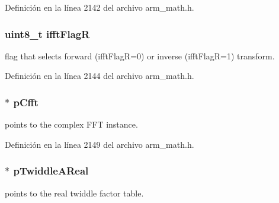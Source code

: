 Definición en la línea 2142 del archivo arm\+\_\+math.\+h.

\subsubsection[{\texorpdfstring{ifft\+FlagR}{ifftFlagR}}]{\setlength{\rightskip}{0pt plus 5cm}uint8\+\_\+t ifft\+FlagR}\hypertarget{structarm__rfft__instance__q15_a787d72055c89e4d62b188d6bd646341c}{}\label{structarm__rfft__instance__q15_a787d72055c89e4d62b188d6bd646341c}
flag that selects forward (ifft\+FlagR=0) or inverse (ifft\+FlagR=1) transform. 

Definición en la línea 2144 del archivo arm\+\_\+math.\+h.

\subsubsection[{\texorpdfstring{p\+Cfft}{pCfft}}]{$\ast$ p\+Cfft}\hypertarget{structarm__rfft__instance__q15_ae0ac7c3a89699793fc0dac960db7f056}{}\label{structarm__rfft__instance__q15_ae0ac7c3a89699793fc0dac960db7f056}
points to the complex F\+FT instance. 

Definición en la línea 2149 del archivo arm\+\_\+math.\+h.

\subsubsection[{\texorpdfstring{p\+Twiddle\+A\+Real}{pTwiddleAReal}}]{$\ast$ p\+Twiddle\+A\+Real}\hypertarget{structarm__rfft__instance__q15_ac17beaa033ab1ea242d49037276b67e2}{}\label{structarm__rfft__instance__q15_ac17beaa033ab1ea242d49037276b67e2}
points to the real twiddle factor table. 

